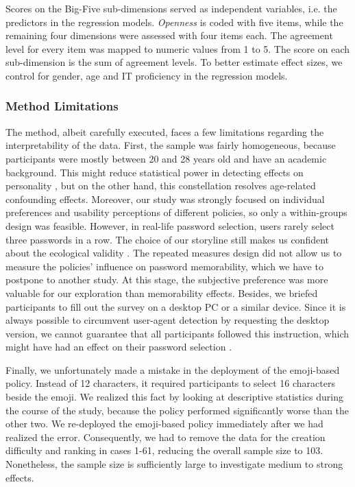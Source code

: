 Scores on the Big-Five sub-dimensions served as independent variables, i.e. the predictors in the regression models. \textit{Openness} is coded with five items, while the remaining four dimensions were assessed with four items each. The agreement level for every item was mapped to numeric values from 1 to 5. The score on each sub-dimension is the sum of agreement levels. To better estimate effect sizes, we control for gender, age and IT proficiency in the regression models. 

\subsubsection{Method Limitations}
The method, albeit carefully executed, faces a few limitations regarding the interpretability of the data. First, the sample was fairly homogeneous, because participants were mostly between 20 and 28 years old and have an academic background. This might reduce statistical power in detecting effects on personality \cite{Srivastava2003PersonalityAdulthood}, but on the other hand, this constellation resolves age-related confounding effects. Moreover, our study was strongly focused on individual preferences and usability perceptions of different policies, so only a within-groups design was feasible. However, in real-life password selection, users rarely select three passwords in a row. The choice of our storyline still makes us confident about the ecological validity \cite{Fahl2013EcologicalValidityPasswordStudy}. The repeated measures design did not allow us to measure the policies' influence on password memorability, which we have to postpone to another study. At this stage, the subjective preference was more valuable for our exploration than memorability effects. Besides, we briefed participants to fill out the survey on a desktop PC or a similar device. Since it is always possible to circumvent user-agent detection by requesting the desktop version, we cannot guarantee that all participants followed this instruction, which might have had an effect on their password selection \cite{Melicher2016UsabilityMobileTextPasswords}. 

Finally, we unfortunately made a mistake in the deployment of the emoji-based policy. Instead of 12 characters, it required participants to select 16 characters beside the emoji. We realized this fact by looking at descriptive statistics during the course of the study, because the policy performed significantly worse than the other two. We re-deployed the emoji-based policy immediately after we had realized the error. Consequently, we had to remove the data for the creation difficulty and ranking in cases 1-61, reducing the overall sample size to 103. Nonetheless, the sample size is sufficiently large to investigate medium to strong effects. 

